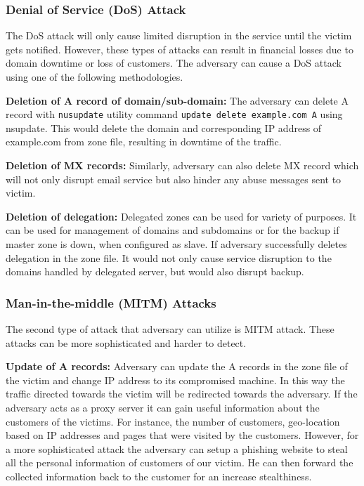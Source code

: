 \subsubsection{Denial of Service (DoS) Attack} 
The DoS attack will only cause limited disruption in the service until the victim gets notified. However, these types of attacks can result in financial losses due to domain downtime or loss of customers. The adversary can cause a DoS attack using one of the following methodologies. 

\textbf{Deletion of A record of domain/sub-domain:} The adversary can delete A record with \texttt{nusupdate} utility command \texttt{update delete example.com A} using nsupdate. This would delete the domain and corresponding IP address of example.com from zone file, resulting in downtime of the traffic. 

\textbf{Deletion of MX records:} Similarly, adversary can also delete MX record which will not only disrupt email service but also hinder any abuse messages sent to victim.  



 \textbf{Deletion of delegation:} Delegated zones can be used for variety of purposes. It can be used for management of domains and subdomains or for the backup if master zone is down,  when configured as slave. If adversary successfully deletes delegation in the zone file. It would not only cause service disruption to the  domains handled by delegated server, but would also disrupt backup. 


\subsubsection{Man-in-the-middle (MITM) Attacks}
The second type of attack that adversary can utilize is MITM attack. These attacks can be more sophisticated and harder to detect. 

\textbf{Update of A records:}
Adversary can update the A records in the zone file of the victim and change IP address to its compromised machine. In this way the traffic directed towards the victim will be redirected towards the adversary. If the adversary acts as a proxy server it can gain useful information about the customers of the victims. For instance, the number of customers, geo-location based on IP addresses and pages that were visited by the customers. However, for a more sophisticated attack the adversary can setup a phishing website to steal all the personal information of customers of our victim. He can then forward the collected information back to the customer for an increase stealthiness. 


